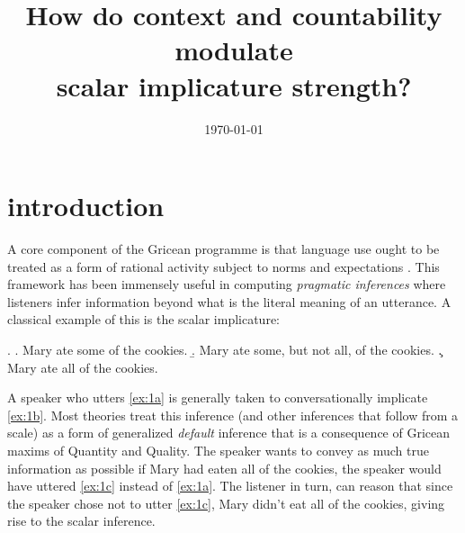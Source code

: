 \documentclass[10pt, biblatex]{report}
\title[phl\oldstylenums{394}k term paper]{How do context and countability modulate\\
                                    scalar implicature strength?}
\author[venkat]{
                \spauthor{venkata s govindarajan}
                }
\date{\today}
\begin{document}
\nocite{*}

\maketitle


%


\section{introduction}
\label{sec:introduction}

A core component of the Gricean programme is that language use ought to be
treated as a form of rational activity subject to norms and expectations
\citep{grice_logic_1975}. This
framework has been immensely useful in computing \textit{pragmatic inferences}
where listeners infer information beyond what is the literal meaning
of an utterance. A classical example of this is the scalar implicature:

\ex. \label{ex:1}\a. Mary ate some of the cookies.\label{ex:1a}
                 \b. Mary ate some, but not all, of the cookies.\label{ex:1b}
                 \c. Mary ate all of the cookies.\label{ex:1c}

A speaker who utters \ref{ex:1a} is generally taken to conversationally
implicate \ref{ex:1b}. Most theories treat this inference (and other inferences
that follow from a scale) as a form of generalized \textit{default} inference
that is a consequence of Gricean maxims of Quantity and Quality\citep{grice_logic_1975,
horn_towards_1984}. The speaker
wants to convey as much true information as possible \dash if Mary had eaten all
of the cookies, the speaker would have uttered \ref{ex:1c} instead of
\ref{ex:1a}. The listener in turn, can
reason that since the speaker chose not to utter \ref{ex:1c}, Mary didn't eat
all of the cookies, giving rise to the scalar inference.
\end{document}
